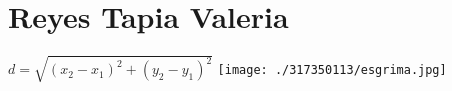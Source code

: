\chapter{Reyes Tapia Valeria}
$d=\sqrt{(x_2-x_1)^2+(y_2-y_1)^2}$
\texttt{[image: ./317350113/esgrima.jpg]}



